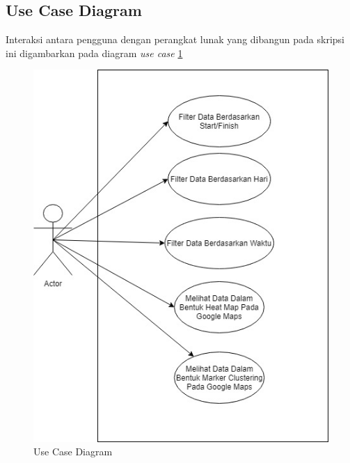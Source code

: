 \subsection{Use Case Diagram}
Interaksi antara pengguna dengan perangkat lunak yang dibangun pada skripsi ini digambarkan pada diagram \textit{use case}  \ref{fig:usecase}
\begin{figure}[H]
	\centering  
	\includegraphics[scale=0.8]{Gambar/KIRI USECASE.jpeg}  
	\caption[Use Case Diagram]{Use Case Diagram} 
	\label{fig:usecase} 
\end{figure} 
